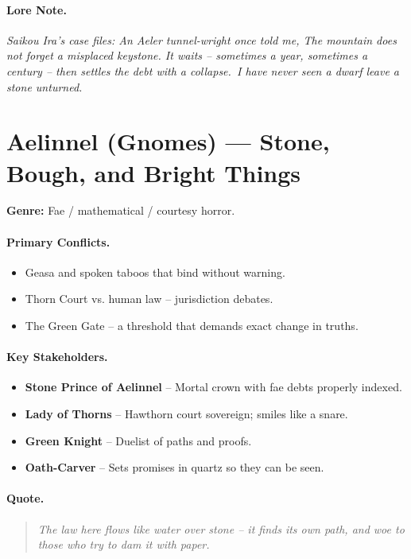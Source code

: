 \paragraph{Lore Note.}
\emph{Saikou Ira's case files: \textquotedbl An Aeler tunnel-wright once told me, \textquotedbl The mountain does not forget a misplaced keystone. It waits -- sometimes a year, sometimes a century -- then settles the debt with a collapse.\textquotedbl\ I have never seen a dwarf leave a stone unturned.\textquotedbl}

\section{Aelinnel (Gnomes) --- \textquotedbl Stone, Bough, and Bright Things\textquotedbl}
\textbf{Genre:} Fae / mathematical / courtesy horror.

\paragraph{Primary Conflicts.}
\begin{itemize}
  \item Geasa and spoken taboos that bind without warning.
  \item Thorn Court vs. human law -- jurisdiction debates.
  \item The Green Gate -- a threshold that demands exact change in truths.
\end{itemize}

\paragraph{Key Stakeholders.}
\begin{itemize}
  \item \textbf{Stone Prince of Aelinnel} -- Mortal crown with fae debts properly indexed.
  \item \textbf{Lady of Thorns} -- Hawthorn court sovereign; smiles like a snare.
  \item \textbf{Green Knight} -- Duelist of paths and proofs.
  \item \textbf{Oath-Carver} -- Sets promises in quartz so they can be seen.
\end{itemize}

\paragraph{Quote.}
\begin{quote}
\emph{\textquotedbl The law here flows like water over stone -- it finds its own path, and woe to those who try to dam it with paper.\textquotedbl}
\end{quote}

